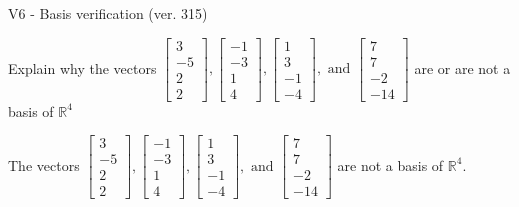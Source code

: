 \begin{exercise}
  \begin{exerciseTitle}V6 - Basis verification (ver. 315)\end{exerciseTitle}
  \begin{exerciseStatement}
    Explain why the vectors \(\left[\begin{array}{r}
3 \\
-5 \\
2 \\
2
\end{array}\right] , \left[\begin{array}{r}
-1 \\
-3 \\
1 \\
4
\end{array}\right] , \left[\begin{array}{r}
1 \\
3 \\
-1 \\
-4
\end{array}\right] , \text{ and } \left[\begin{array}{r}
7 \\
7 \\
-2 \\
-14
\end{array}\right]\) are or are not a basis of \(\mathbb{R}^4\)	


  \end{exerciseStatement}
  \begin{exerciseAnswer}
   The vectors \(\left[\begin{array}{r}
3 \\
-5 \\
2 \\
2
\end{array}\right] , \left[\begin{array}{r}
-1 \\
-3 \\
1 \\
4
\end{array}\right] , \left[\begin{array}{r}
1 \\
3 \\
-1 \\
-4
\end{array}\right] , \text{ and } \left[\begin{array}{r}
7 \\
7 \\
-2 \\
-14
\end{array}\right]\) 
  	 are not  a basis of \(\mathbb{R}^4\).
  


  \end{exerciseAnswer}
\end{exercise}